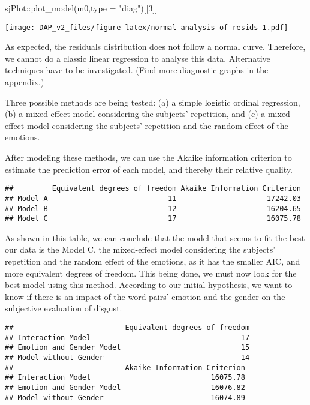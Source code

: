 \documentclass[
]{article}
\newenvironment{Shaded}{\begin{snugshade}}{\end{snugshade}}
\newcommand{\AttributeTok}[1]{\textcolor[rgb]{0.77,0.63,0.00}{#1}}
\newcommand{\DecValTok}[1]{\textcolor[rgb]{0.00,0.00,0.81}{#1}}
\newcommand{\FunctionTok}[1]{\textcolor[rgb]{0.00,0.00,0.00}{#1}}
\newcommand{\NormalTok}[1]{#1}
\newcommand{\SpecialCharTok}[1]{\textcolor[rgb]{0.00,0.00,0.00}{#1}}
\newcommand{\StringTok}[1]{\textcolor[rgb]{0.31,0.60,0.02}{#1}}
\begin{document}
\begin{Shaded}
\begin{Highlighting}[]
\NormalTok{sjPlot}\SpecialCharTok{::}\FunctionTok{plot\_model}\NormalTok{(m0,}\AttributeTok{type =} \StringTok{"diag"}\NormalTok{)[[}\DecValTok{3}\NormalTok{]]}
\end{Highlighting}
\end{Shaded}

\texttt{[image: DAP\_v2\_files/figure-latex/normal analysis of resids-1.pdf]}

As expected, the residuals distribution does not follow a normal curve.
Therefore, we cannot do a classic linear regression to analyse this
data. Alternative techniques have to be investigated. (Find more
diagnostic graphs in the appendix.)

Three possible methods are being tested: (a) a simple logistic ordinal
regression, (b) a mixed-effect model considering the subjects'
repetition, and (c) a mixed-effect model considering the subjects'
repetition and the random effect of the emotions.

After modeling these methods, we can use the Akaike information
criterion to estimate the prediction error of each model, and thereby
their relative quality.

\begin{verbatim}
##         Equivalent degrees of freedom Akaike Information Criterion
## Model A                            11                     17242.03
## Model B                            12                     16204.65
## Model C                            17                     16075.78
\end{verbatim}

As shown in this table, we can conclude that the model that seems to fit
the best our data is the Model C, the mixed-effect model considering the
subjects' repetition and the random effect of the emotions, as it has
the smaller AIC, and more equivalent degrees of freedom. This being
done, we must now look for the best model using this method. According
to our initial hypothesis, we want to know if there is an impact of the
word pairs' emotion and the gender on the subjective evaluation of
disgust.

\begin{verbatim}
##                          Equivalent degrees of freedom
## Interaction Model                                   17
## Emotion and Gender Model                            15
## Model without Gender                                14
##                          Akaike Information Criterion
## Interaction Model                            16075.78
## Emotion and Gender Model                     16076.82
## Model without Gender                         16074.89
\end{verbatim}
\end{document}
